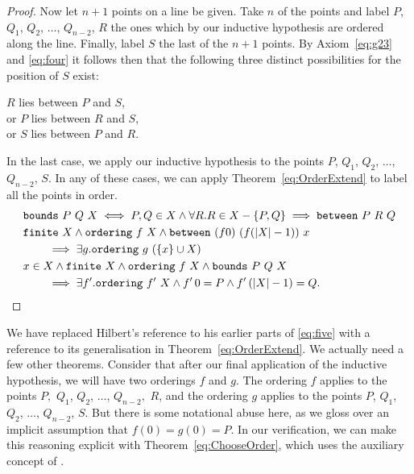 \begin{proof}
Now let $n+1$ points on a line be given. Take $n$ of the points and label $P$, $Q_1$, $Q_2$, $\ldots$, $Q_{n-2}$, $R$ the ones which by our inductive hypothesis are ordered along the line. Finally, label $S$ the last of the $n+1$ points. By Axiom~\ref{eq:g23} and \ref{eq:four} it follows then that the following three distinct possibilities for the position of $S$ exist:

\vspace{0.5cm}
\noindent $R$ lies between $P$ and $S$,\\
\noindent or $P$ lies between $R$ and $S$,\\
\noindent or $S$ lies between $P$ and $R$.
\vspace{0.5cm}

In the last case, we apply our inductive hypothesis to the points $P$, $Q_1$, $Q_2$, $\ldots$, $Q_{n-2}$, $S$. In any of these cases, we can apply Theorem~\ref{eq:OrderExtend} to label all the points in order.
\begin{align}
  \label{eq:BoundsDef}
  &\texttt{bounds}\ P\ Q\ X \iff P,Q \in X \wedge \forall R. R \in X - \{P,Q\} \implies \texttt{between}\ P\ R\ Q\\
  \label{eq:OrderExtend}
  &\texttt{finite}\ X \wedge \texttt{ordering}\ f\ X \wedge \texttt{between}\ (f 0)\ (f (|X| - 1))\ x\notag\\
  &\qquad \implies \exists g. \texttt{ordering}\ g\ (\{x\} \cup X)\\
  \label{eq:ChooseOrder}
  &x \in X \wedge \texttt{finite}\ X \wedge \texttt{ordering}\ f\ X \wedge \texttt{bounds}\ P\ Q\ X\notag\\
  &\qquad\implies\exists f'. \texttt{ordering}\ f'\ X \wedge f'\,0 = P \wedge f'\,(|X| - 1) = Q.
\end{align}

\end{proof}
We have replaced Hilbert's reference to his earlier parts of \ref{eq:five} with a reference to its generalisation in Theorem~\ref{eq:OrderExtend}. We actually need a few other theorems. Consider that after our final application of the inductive hypothesis, we will have two orderings $f$ and $g$. The ordering $f$ applies to the points $P,$ $Q_1$, $Q_2$, $\ldots$, $Q_{n-2},$ $R$, and the ordering $g$ applies to the points $P$, $Q_1$, $Q_2$, $\ldots$, $Q_{n-2}$, $S$. But  there is some notational abuse here, as we gloss over an implicit assumption that $f(0) = g(0) = P$. In our verification, we can make this reasoning explicit with Theorem~\ref{eq:ChooseOrder}, which uses the auxiliary concept of . 

